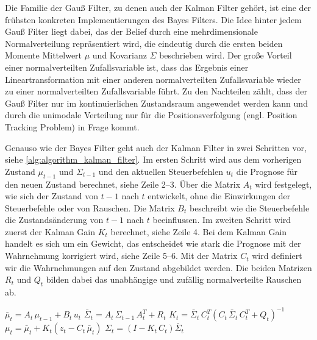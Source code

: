 Die Familie der Gauß Filter, zu denen auch der Kalman Filter gehört, ist eine der frühsten konkreten Implementierungen des Bayes Filters. Die Idee hinter jedem Gauß Filter liegt dabei, das der Belief durch eine mehrdimensionale Normalverteilung repräsentiert wird, die eindeutig durch die ersten beiden Momente Mittelwert $\mu$ und Kovarianz $\Sigma$ beschrieben wird. Der große Vorteil einer normalverteilten Zufallsvariable ist, dass das Ergebnis einer Lineartransformation mit einer anderen normalverteilten Zufallsvariable wieder zu einer normalverteilten Zufallsvariable führt. Zu den Nachteilen zählt, dass der Gauß Filter nur im kontinuierlichen Zustandsraum angewendet werden kann und durch die unimodale Verteilung nur für die Positionsverfolgung (engl. Position Tracking Problem) in Frage kommt.

Genauso wie der Bayes Filter geht auch der Kalman Filter in zwei Schritten vor, siehe \autoref{alg:algorithm_kalman_filter}. Im ersten Schritt wird aus dem vorherigen Zustand $\mu_{t-1}$ und $\Sigma_{t-1}$ und den aktuellen Steuerbefehlen $u_t$ die Prognose für den neuen Zustand berechnet, siehe Zeile 2--3. Über die Matrix $A_t$ wird festgelegt, wie sich der Zustand von $t-1$ nach $t$ entwickelt, ohne die Einwirkungen der Steuerbefehle oder von Rauschen. Die Matrix $B_t$ beschreibt wie die Steuerbefehle die Zustandsänderung von $t-1$ nach $t$ beeinflussen. Im zweiten Schritt wird zuerst der Kalman Gain $K_t$ berechnet, siehe Zeile 4. Bei dem Kalman Gain handelt es sich um ein Gewicht, das entscheidet wie stark die Prognose mit der Wahrnehmung korrigiert wird, siehe Zeile 5--6. Mit der Matrix $C_t$ wird definiert wir die Wahrnehmungen auf den Zustand abgebildet werden. Die beiden Matrizen $R_t$ und $Q_t$ bilden dabei das unabhängige und zufällig normalverteilte Rauschen ab.


\begin{algorithm}
\begin{onehalfspacing}
	\DontPrintSemicolon
	{
		$\bar{\mu}_t = A_t \, \mu_{t-1} + B_t \, u_t$\;
		$\bar{\Sigma}_t = A_t \, \Sigma_{t-1} \, A^T_t + R_t$\;
		\BlankLine
		\BlankLine
		$K_t = \bar{\Sigma}_t \, C^T_t (C_t \, \bar{\Sigma}_t \, C^T_t + Q_t)^{-1}$\;
		$\mu_t = \bar{\mu}_t + K_t (z_t - C_t \, \bar{\mu}_t)$\;
		$\Sigma_t = (I - K_t \, C_t) \bar{\Sigma}_t$\;
	}
\label{alg:algorithm_kalman_filter}
\end{onehalfspacing}
\end{algorithm}


